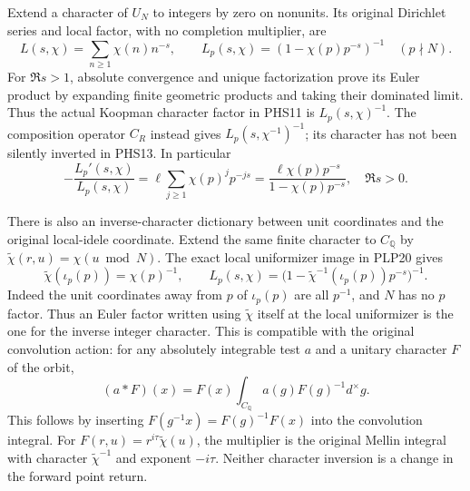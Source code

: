 Extend a character of $U_N$ to integers by zero on nonunits.
Its original Dirichlet series and local factor, with no completion
multiplier, are
\begin{equation}\tag{PHS13}
 L(s,\chi)=\sum_{n\ge1}\chi(n)n^{-s},\qquad
 L_p(s,\chi)=(1-\chi(p)p^{-s})^{-1}\quad(p\nmid N).
\end{equation}
For $\Re s>1$, absolute convergence and unique factorization
prove its Euler product by expanding finite geometric products and
taking their dominated limit. Thus the actual Koopman character
factor in PHS11 is $L_p(s,\chi)^{-1}$. The composition operator
$C_R$ instead gives $L_p(s,\chi^{-1})^{-1}$; its character has
not been silently inverted in PHS13. In particular
\begin{equation}\tag{PHS14}
 -\frac{L_p'(s,\chi)}{L_p(s,\chi)}
       =\ell\sum_{j\ge1}\chi(p)^j p^{-js}
       =\frac{\ell\chi(p)p^{-s}}{1-\chi(p)p^{-s}},
 \quad\Re s>0.
\end{equation}

There is also an inverse-character dictionary between unit
coordinates and the original local-idele coordinate. Extend the
same finite character to $C_{\mathbb Q}$ by
$\widetilde\chi(r,u)=\chi(u\bmod N)$. The exact local uniformizer
image in PLP20 gives
\begin{equation}\tag{PHS14a}
 \widetilde\chi(\iota_p(p))=\chi(p)^{-1},\qquad
 L_p(s,\chi)=
 \bigl(1-\widetilde\chi^{-1}(\iota_p(p))p^{-s}\bigr)^{-1}.
\end{equation}
Indeed the unit coordinates away from $p$ of $\iota_p(p)$ are
all $p^{-1}$, and $N$ has no $p$ factor. Thus an Euler factor
written using $\widetilde\chi$ itself at the local uniformizer
is the one for the inverse integer character. This is compatible
with the original convolution action: for any absolutely integrable
test $a$ and a unitary character $F$ of the orbit,
\begin{equation}\tag{PHS14b}
 (a*F)(x)=F(x)\int_{C_{\mathbb Q}}a(g)F(g)^{-1}d^{\times}g.
\end{equation}
This follows by inserting $F(g^{-1}x)=F(g)^{-1}F(x)$ into the
convolution integral. For $F(r,u)=r^{i\tau}\widetilde\chi(u)$,
the multiplier is the original Mellin integral with character
$\widetilde\chi^{-1}$ and exponent $-i\tau$. Neither character
inversion is a change in the forward point return.

